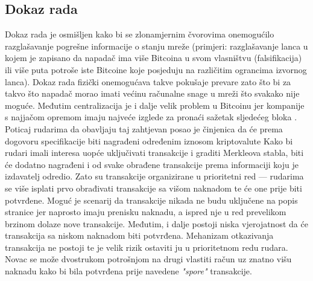 \documentclass[utf8, zavrsni]{fer}
\begin{document}
\subsection{Dokaz rada}
Dokaz rada je osmišljen kako bi se zlonamjernim čvorovima onemogućilo razglašavanje pogrešne informacije o stanju mreže (primjeri: razglašavanje lanca u kojem je zapisano da napadač ima više Bitcoina u svom vlasništvu (falsifikacija) ili više puta potroše iste Bitcoine koje posjeduju na različitim ograncima izvornog lanca). Dokaz rada fizički onemogućava takve pokušaje prevare zato što bi za takvo što napadač morao imati većinu računalne snage u mreži što svakako nije moguće. Međutim centralizacija je i dalje velik problem u Bitcoinu jer kompanije s najjačom opremom imaju najveće izglede za pronaći sažetak sljedećeg bloka \cite{9160462}. Poticaj rudarima da obavljaju taj zahtjevan posao je činjenica da će prema dogovoru specifikacije biti nagrađeni određenim iznosom kriptovalute \footnotemark
{}
Kako bi rudari imali interesa uopće uključivati transakcije i graditi Merkleova stabla, biti će dodatno nagrađeni i od svake obrađene transakcije prema informaciji koju je izdavatelj odredio. Zato su transakcije organizirane u prioritetni red --- rudarima se više isplati prvo obrađivati transakcije sa višom naknadom te će one prije biti potvrđene. Moguć je scenarij da transakcije nikada ne budu uključene na popis stranice jer naprosto imaju prenisku naknadu, a ispred nje u red prevelikom brzinom dolaze nove transakcije. Međutim, i dalje postoji niska vjerojatnost da  će transakcija sa niskom naknadom biti potvrđena. Mehanizam otkazivanja transakcija ne postoji te je velik rizik ostaviti ju u prioritetnom redu rudara. Novac se može  dvostrukom potrošnjom \footnotemark na drugi vlastiti račun uz znatno višu naknadu kako bi bila potvrđena prije navedene \textit{"spore"} transakcije.
\end{document}
